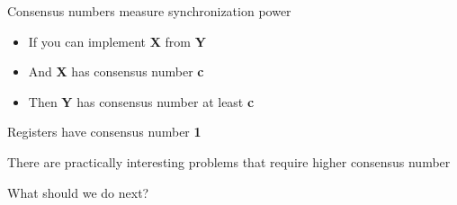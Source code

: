 \begin{frame}{Consensus numbers measure synchronization power}

\begin{theorem}
\begin{itemize}
  \item If you can implement \textbf{X} from \textbf{Y}
  \item And \textbf{X} has consensus number \textbf{c}
  \item Then \textbf{Y} has consensus number at least \textbf{c}
\end{itemize}
\end{theorem}

\pause

Registers have consensus number \textbf{1}

\pause

There are practically interesting problems that require higher consensus number

\pause

What should we do next?

\end{frame}

